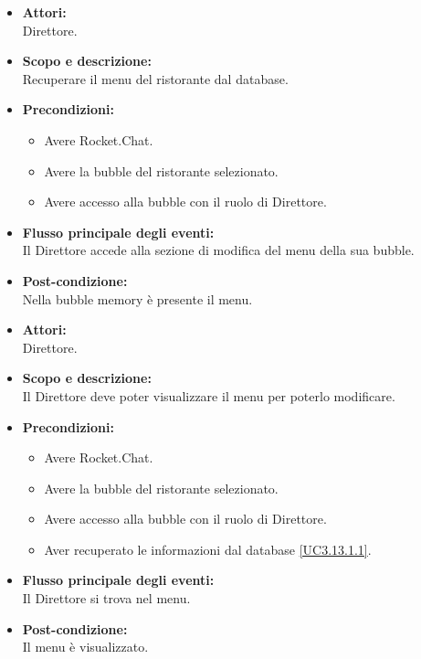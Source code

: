 
\begin{itemize}
	\item \textbf{Attori:}
	\\Direttore.
	\item \textbf{Scopo e descrizione:} 
	\\Recuperare il menu del ristorante dal database.
	\item \textbf{Precondizioni:}
	\begin{itemize}
		\item Avere Rocket.Chat.
		\item Avere la bubble del ristorante selezionato.
		\item Avere accesso alla bubble con il ruolo di Direttore.
	\end{itemize}
	\item \textbf{Flusso principale degli eventi:}
	\\Il Direttore accede alla sezione di modifica del menu della sua bubble.
	\item \textbf{Post-condizione:}
	\\Nella bubble memory è presente il menu.
\end{itemize}


\begin{itemize}
	\item \textbf{Attori:}
	\\Direttore.
	\item \textbf{Scopo e descrizione:} 
	\\Il Direttore deve poter visualizzare il menu per poterlo modificare.
	\item \textbf{Precondizioni:}
	\begin{itemize}
		\item Avere Rocket.Chat.
		\item Avere la bubble del ristorante selezionato.
		\item Avere accesso alla bubble con il ruolo di Direttore.
		\item Aver recuperato le informazioni dal database \ref{UC3.13.1.1}.
	\end{itemize}
	\item \textbf{Flusso principale degli eventi:}
	\\Il Direttore si trova nel menu.
	\item \textbf{Post-condizione:}
	\\Il menu è visualizzato.
\end{itemize}

